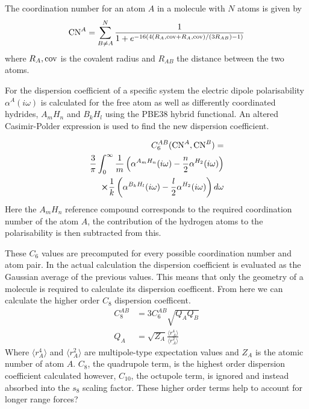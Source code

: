 \documentclass[10pt,a4paper,twocolumn,twoside]{extarticle}
\begin{document}
	The coordination number for an atom $A$ in a molecule with $N$ atoms is given by 
	{\small
	\begin{align}
		{\rm CN}^A = \sum_{B \neq A}^N \frac{1}{1 + e^{-16(4(R_A,{\rm cov} + R_A,{\rm cov})/(3R_{AB}) - 1)}}
	\end{align}}
	where $R_A,{\rm cov}$ is the covalent radius and $R_{AB}$ the distance between the two atoms.

	For the dispersion coefficient of a specific system the electric dipole polarisability $\alpha^A (i\omega)$ is calculated for the free atom as well as differently coordinated hydrides, $A_mH_n$ and $B_kH_l$ using the PBE38 hybrid functional.\cite{Grimme2011} An altered Casimir-Polder expression is used to find the new dispersion coefficient. 

	\begin{align}
		C_6^{AB} ({\rm CN}^A , {\rm CN}^B) =  \nonumber \\ \frac{3}{\pi} \int^{\infty}_0 \frac{1}{m} \left(\alpha^{A_m H_n}(i\omega) - \frac{n}{2} \alpha^{H_2} (i\omega) \right) \nonumber \\ \cross \frac{1}{k} \left(\alpha^{B_k H_l}(i\omega) - \frac{l}{2} \alpha^{H_2} (i\omega)\right) d\omega 
	\end{align}
	Here the $A_mH_n$ reference compound corresponds to the required coordination number of the atom $A$, the contribution of the hydrogen atoms to the polarisability is then subtracted from this. 
	
	These $C_6$ values are precomputed for every possible coordination number and atom pair. In the actual calculation the dispersion coefficient is evaluated as the Gaussian average of the previous values. This means that only the geometry of a molecule is required to calculate its dispersion coefficent. From here we can calculate the higher order $C_8$ dispersion coefficent.
	\begin{align}
		C_8^{AB} &= 3C_6^{AB} \sqrt{Q_A Q_B}\\
		Q_A  &= \sqrt{Z_A} \frac{\langle r_A^4 \rangle}{\langle r_A^2 \rangle}
	\end{align}
	Where $\langle r_A^4 \rangle$ and $\langle r_A^2 \rangle$ are multipole-type expectation values and $Z_A$ is the atomic number of atom $A$. $C_8$, the quadrupole term, is the highest order dispersion coefficient calculated however, $C_{10}$, the octupole term, is ignored and instead absorbed into the $s_8$ scaling factor. These higher order terms help to account for longer range forces? 
\end{document}
